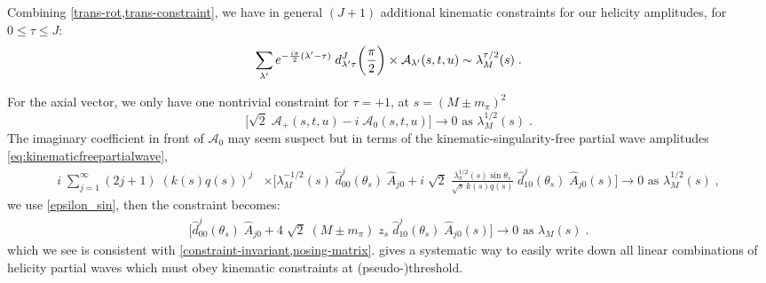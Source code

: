 Combining \cref{trans-rot,trans-constraint}, we have in general \((J + 1)\) additional kinematic constraints for our helicity amplitudes, for \(0 \leq \tau \leq J\):
  \begin{equation}
    \sum_{{\lambda^\prime}} e^{-\frac{i\pi}{2} ({\lambda^\prime} - \tau)} \; d^J_{{\lambda^\prime} \tau}\bigg(\frac{\pi}{2} \bigg) \times \mathcal{A}_{\lambda^\prime}(s,t,u) \sim \lambda^{\tau/2}_M(s)   \; .
  \end{equation}

For the axial vector, we only have one nontrivial constraint for \(\tau = +1\), at \(s = (M \pm  m_\pi)^2\)
  \begin{equation}
      \bigg[ \sqrt{2} \; \mathcal{A}_+(s,t,u) - i \; \mathcal{A}_0(s,t,u) \bigg] \to 0 \text{ as } \lambda^{1/2}_M(s) \; .
  \end{equation}
%
The imaginary coefficient in front of \(\mathcal{A}_0\) may seem suspect but in terms of the kinematic-singularity-free partial wave amplitudes \cref{eq:kinematicfreepartialwave},
  \begin{align}
          i \;  \sum_{j=1}^\infty (2j+1) \; (k(s)q(s))^{j} &\times
          \bigg[\lambda_M^{-1/2}(s) \; \hat{d}_{00}^j(\theta_s) \; \hat{A}_{j0}
           + i \; \sqrt{2} \; \frac{\lambda^{1/2}_\pi(s) \sin \theta_s}{\sqrt{s} \, k(s)q(s)} \; \hat{d}_{10}^j(\theta_s) \; \hat{A}_{j0}(s) \bigg]
           \to 0 \text{ as } \lambda^{1/2}_M(s) \; ,
  \end{align}
we use \cref{epsilon_sin}, then the constraint becomes:
  \begin{align}
          \bigg[\hat{d}_{00}^j(\theta_s) \; \hat{A}_{j0}
           + 4 \; \sqrt{2} \; (M \pm m_\pi) \; z_s \; \hat{d}_{10}^j(\theta_s) \; \hat{A}_{j0}(s) \bigg]
           \to 0 \text{ as } \lambda_M(s) \; .
  \end{align}
which we see is consistent with \cref{constraint-invariant,nosing-matrix}.  gives a systematic way to easily write down all linear combinations of helicity partial waves which must obey kinematic constraints at (pseudo-)threshold.
